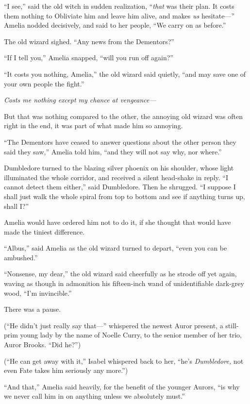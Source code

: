 “I see,” said the old witch in sudden realization, “\emph{that} was their plan. It costs them nothing to Obliviate him and leave him alive, and makes \emph{us} hesitate—” Amelia nodded decisively, and said to her people, “We carry on as before.”

The old wizard sighed. “Any news from the Dementors?”

“If I tell you,” Amelia snapped, “will you run off again?”

“It costs you nothing, Amelia,” the old wizard said quietly, “and may save one of your own people the fight.”

\emph{Costs me nothing except my chance at vengeance—}

But that was nothing compared to the other, the annoying old wizard was often right in the end, it was part of what made him so annoying.

“The Dementors have ceased to answer questions about the other person they said they saw,” Amelia told him, “and they will not say why, nor where.”

Dumbledore turned to the blazing silver phoenix on his shoulder, whose light illuminated the whole corridor, and received a silent head-shake in reply. “I cannot detect them either,” said Dumbledore. Then he shrugged. “I suppose I shall just walk the whole spiral from top to bottom and see if anything turns up, shall I?”

Amelia would have ordered him not to do it, if she thought that would have made the tiniest difference.

“Albus,” said Amelia as the old wizard turned to depart, “even you can be ambushed.”

“Nonsense, my dear,” the old wizard said cheerfully as he strode off yet again, waving as though in admonition his fifteen-inch wand of unidentifiable dark-grey wood, “I’m invincible.”

There was a pause.

(“He didn’t just really say that—” whispered the newest Auror present, a still-prim young lady by the name of Noelle Curry, to the senior member of her trio, Auror Brooks. “Did he?”)

(“He can get away with it,” Isabel whispered back to her, “he’s \emph{Dumbledore,} not even Fate takes him seriously any more.”)

“And that,” Amelia said heavily, for the benefit of the younger Aurors, “is why we never call him in on anything unless we absolutely must.”

\later


